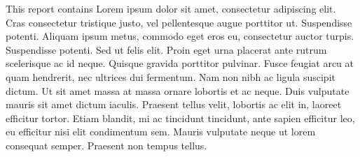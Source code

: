 This report contains
Lorem ipsum dolor sit amet, consectetur adipiscing elit. Cras consectetur tristique justo, vel pellentesque augue porttitor ut. Suspendisse potenti. Aliquam ipsum metus, commodo eget eros eu, consectetur auctor turpis. Suspendisse potenti. Sed ut felis elit. Proin eget urna placerat ante rutrum scelerisque ac id neque. Quisque gravida porttitor pulvinar. Fusce feugiat arcu at quam hendrerit, nec ultrices dui fermentum. Nam non nibh ac ligula suscipit dictum. Ut sit amet massa at massa ornare lobortis et ac neque. Duis vulputate mauris sit amet dictum iaculis. Praesent tellus velit, lobortis ac elit in, laoreet efficitur tortor. Etiam blandit, mi ac tincidunt tincidunt, ante sapien efficitur leo, eu efficitur nisi elit condimentum sem. Mauris vulputate neque ut lorem consequat semper. Praesent non tempus tellus.